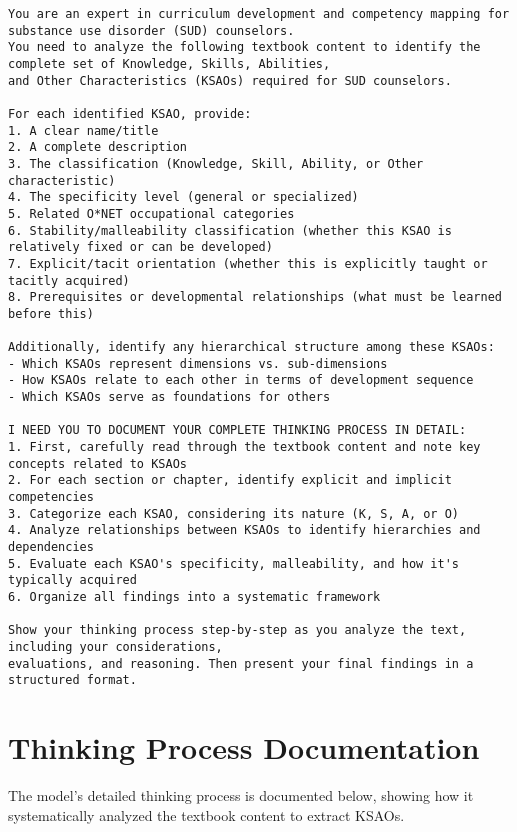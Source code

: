 \documentclass[
  letterpaper,
  DIV=11,
  numbers=noendperiod]{scrartcl}
\begin{document}
\begin{verbatim}
You are an expert in curriculum development and competency mapping for substance use disorder (SUD) counselors. 
You need to analyze the following textbook content to identify the complete set of Knowledge, Skills, Abilities, 
and Other Characteristics (KSAOs) required for SUD counselors.

For each identified KSAO, provide:
1. A clear name/title
2. A complete description
3. The classification (Knowledge, Skill, Ability, or Other characteristic)
4. The specificity level (general or specialized)
5. Related O*NET occupational categories
6. Stability/malleability classification (whether this KSAO is relatively fixed or can be developed)
7. Explicit/tacit orientation (whether this is explicitly taught or tacitly acquired)
8. Prerequisites or developmental relationships (what must be learned before this)

Additionally, identify any hierarchical structure among these KSAOs:
- Which KSAOs represent dimensions vs. sub-dimensions
- How KSAOs relate to each other in terms of development sequence
- Which KSAOs serve as foundations for others

I NEED YOU TO DOCUMENT YOUR COMPLETE THINKING PROCESS IN DETAIL:
1. First, carefully read through the textbook content and note key concepts related to KSAOs
2. For each section or chapter, identify explicit and implicit competencies
3. Categorize each KSAO, considering its nature (K, S, A, or O)
4. Analyze relationships between KSAOs to identify hierarchies and dependencies
5. Evaluate each KSAO's specificity, malleability, and how it's typically acquired
6. Organize all findings into a systematic framework

Show your thinking process step-by-step as you analyze the text, including your considerations,
evaluations, and reasoning. Then present your final findings in a structured format.
\end{verbatim}

\section{Thinking Process
Documentation}\label{thinking-process-documentation}

The model's detailed thinking process is documented below, showing how
it systematically analyzed the textbook content to extract KSAOs.
\end{document}
